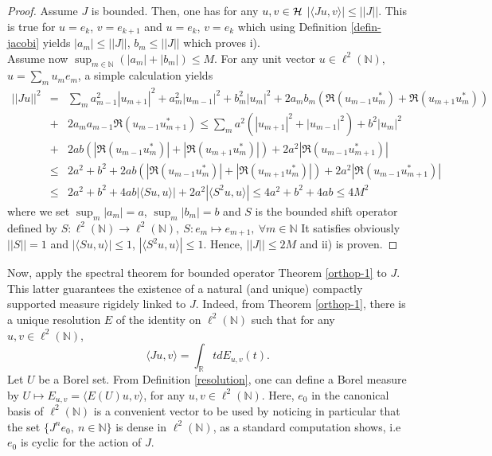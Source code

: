 \documentclass[a4paper,11pt,twoside]{article}
\numberwithin{equation}{section}
\theoremstyle{nonumberplain}
\newtheorem{proof}{Proof}
\newcounter{and}
\begin{document}
\begin{proof}
Assume $J$ is bounded. Then, one has for any $u,v\in\cal{H}$ $|\langle Ju,v \rangle|\le ||J||$. This is true for $u=e_k$, $v=e_{k+1}$ and $u=e_k$, $v=e_k$ which using Definition \ref{defin-jacobi} yields $|a_m|\le||J||$, $b_m\le||J||$ which proves i). \\
Assume now $\sup_{m\in\mathbb{N}}(|a_m|+|b_m|)\le M$. For any unit vector $u\in\ell^2(\mathbb{N})$, $u=\sum_mu_me_m$, a simple calculation yields
\begin{eqnarray}
||Ju||^2&=&\sum_ma^2_{m-1}|u_{m+1}|^2+a^2_m|u_{m-1}|^2+b^2_m|u_m|^2+2a_mb_m(\Re(u_{m-1}u^*_m)+\Re(u_{m+1}u^*_m))\nonumber\\
&+&2a_ma_{m-1}\Re(u_{m-1}u^*_{m+1})\le\sum_ma^2(|u_{m+1}|^2+|u_{m-1}|^2)+b^2|u_m|^2\nonumber\\
&+&2ab(|\Re(u_{m-1}u^*_m)|+|\Re(u_{m+1}u^*_m)|)+2a^2|\Re(u_{m-1}u^*_{m+1})|\nonumber\\
&\le&2a^2+b^2+2ab(|\Re(u_{m-1}u^*_m)|+|\Re(u_{m+1}u^*_m)|)+2a^2|\Re(u_{m-1}u^*_{m+1})|\nonumber\\
&\le&2a^2+b^2+4ab|\langle Su,u \rangle|+2a^2|\langle S^2u,u\rangle|\le4a^2+b^2+4ab\le4M^2
\label{sum-ju-maj}
\end{eqnarray}
where we set $\sup_m|a_m|=a$, $\sup_m|b_m|=b$ and $S$ is the bounded shift operator defined by $
S:\ell^2(\mathbb{N})\to\ell^2(\mathbb{N}),\ S:e_m\mapsto e_{m+1},\ \forall m\in\mathbb{N}$
It satisfies obviously $||S||=1$ and $|\langle Su,u\rangle|\le1$, $|\langle S^2u,u \rangle|\le1$. Hence, $||J||\le2M$ and ii) is proven.
\end{proof} 
Now, apply the spectral theorem for bounded operator Theorem \ref{orthop-1} to $J$. This latter guarantees the existence of a natural (and unique) compactly supported measure rigidely linked to $J$. Indeed, from Theorem \ref{orthop-1}, there is a unique resolution $E$ of the identity on $\ell^2(\mathbb{N})$ such that for any $u,v\in\ell^2(\mathbb{N})$, 
\begin{equation}
\langle Ju,v \rangle=\int_\mathbb{R}tdE_{u,v}(t). 
\end{equation}
Let $U$ be a Borel set. From Definition \ref{resolution}, one can define a Borel measure by $U\mapsto E_{u,v}=\langle E(U)u,v \rangle$, for any $u,v\in\ell^2(\mathbb{N})$. Here, $e_0$ in the canonical basis of $\ell^2(\mathbb{N})$ is a convenient vector to be used by noticing in particular that the set $\{J^ne_0,\ n\in\mathbb{N}\}$ is dense in $\ell^2(\mathbb{N})$, as a standard computation shows, i.e $e_0$ is cyclic for the action of $J$.
\end{document}
